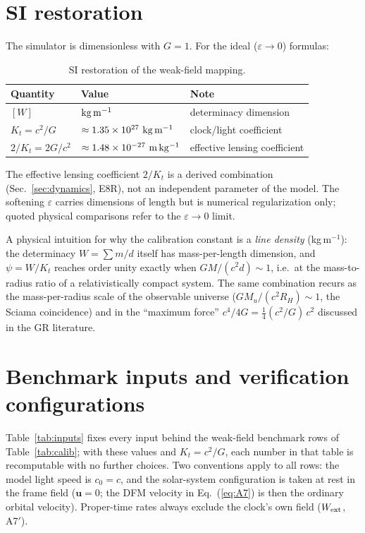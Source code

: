 \documentclass[aps,reprint,amsmath,amssymb,nofootinbib,superscriptaddress,floatfix]{revtex4-2}
\newcommand{\vect}[1]{\bm{#1}}
\newcommand{\Kt}{K_t}
\begin{document}
\section{SI restoration}
\label{app:si}

The simulator is dimensionless with $G = 1$.
For the ideal ($\varepsilon \to 0$) formulas:

\begin{table}[h]
\caption{\label{tab:si}SI restoration of the weak-field mapping.}
\begin{ruledtabular}
\begin{tabular}{llp{}}
Quantity & Value & Note \\
\hline
$[W]$ & ${\rm kg\,m^{-1}}$ & determinacy dimension \\
$\Kt = c^2/G$ & $\approx 1.35\times10^{27}\ {\rm kg\,m^{-1}}$ &
clock/light coefficient \\
$2/\Kt = 2G/c^2$ & $\approx 1.48\times10^{-27}\ {\rm m\,kg^{-1}}$ &
effective lensing coefficient \\
\end{tabular}
\end{ruledtabular}
\end{table}

The effective lensing coefficient $2/\Kt$ is a derived combination
(Sec.~\ref{sec:dynamics}, E8R), not an independent parameter of the
model.
The softening $\varepsilon$ carries dimensions of length but is
numerical regularization only; quoted physical comparisons refer to
the $\varepsilon \to 0$ limit.

A physical intuition for why the calibration constant is a \emph{line
density} (kg\,m$^{-1}$): the determinacy $W = \sum m/d$ itself has
mass-per-length dimension, and $\psi = W/\Kt$ reaches order unity
exactly when $GM/(c^2 d) \sim 1$, i.e.\ at the mass-to-radius ratio of
a relativistically compact system.
The same combination recurs as the mass-per-radius scale of the
observable universe ($GM_u/(c^2R_H) \sim 1$, the Sciama coincidence)
and in the ``maximum force'' $c^4/4G = \tfrac14(c^2/G)\,c^2$ discussed
in the GR literature.

\section{Benchmark inputs and verification configurations}
\label{app:inputs}

Table~\ref{tab:inputs} fixes every input behind the weak-field
benchmark rows of Table~\ref{tab:calib}; with these values and
$\Kt = c^2/G$, each number in that table is recomputable with no
further choices.
Two conventions apply to all rows: the model light speed is
$c_0 = c$, and the solar-system configuration is taken at rest in the
frame field ($\vect{u} = 0$; the DFM velocity in Eq.~(\ref{eq:A7}) is
then the ordinary orbital velocity).
Proper-time rates always exclude the clock's own field
($W_{\rm ext}$, A7$'$).
\end{document}
